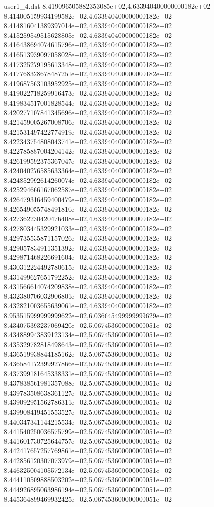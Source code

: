 \begin{filecontents}{user1_4.dat}
8.419096505882353085e+02,4.633940400000000182e+02
8.414005159934199582e+02,4.633940400000000182e+02
8.414816041389397014e+02,4.633940400000000182e+02
8.415259549515628805e+02,4.633940400000000182e+02
8.416438694074615796e+02,4.633940400000000182e+02
8.416513939097058028e+02,4.633940400000000182e+02
8.417325279195613348e+02,4.633940400000000182e+02
8.417768328678487251e+02,4.633940400000000182e+02
8.419687563103952925e+02,4.633940400000000182e+02
8.419022718259916473e+02,4.633940400000000182e+02
8.419834517001828544e+02,4.633940400000000182e+02
8.420277107841345696e+02,4.633940400000000182e+02
8.421459005267008706e+02,4.633940400000000182e+02
8.421531497422774919e+02,4.633940400000000182e+02
8.422343754808043741e+02,4.633940400000000182e+02
8.422785887004204142e+02,4.633940400000000182e+02
8.426199592375367047e+02,4.633940400000000182e+02
8.424040276585633364e+02,4.633940400000000182e+02
8.424852992614260074e+02,4.633940400000000182e+02
8.425294666167062587e+02,4.633940400000000182e+02
8.426479316459400479e+02,4.633940400000000182e+02
8.426549055748491810e+02,4.633940400000000182e+02
8.427362230420476408e+02,4.633940400000000182e+02
8.427803445329921033e+02,4.633940400000000182e+02
8.429735535871157026e+02,4.633940400000000182e+02
8.429057834911351392e+02,4.633940400000000182e+02
8.429871468226691604e+02,4.633940400000000182e+02
8.430312224492780615e+02,4.633940400000000182e+02
8.431499627651792252e+02,4.633940400000000182e+02
8.431566614074209838e+02,4.633940400000000182e+02
8.432380706032906801e+02,4.633940400000000182e+02
8.432821003655639061e+02,4.633940400000000182e+02
8.953515999999999622e+02,6.036645499999999629e+02
8.434075393237069420e+02,5.067453600000000051e+02
8.434889943839123134e+02,5.067453600000000051e+02
8.435329782818498643e+02,5.067453600000000051e+02
8.436519938844185162e+02,5.067453600000000051e+02
8.436584172399927866e+02,5.067453600000000051e+02
8.437399181645338331e+02,5.067453600000000051e+02
8.437838561981357088e+02,5.067453600000000051e+02
8.439783508638361127e+02,5.067453600000000051e+02
8.439092951562786311e+02,5.067453600000000051e+02
8.439908419451553527e+02,5.067453600000000051e+02
8.440347341144215534e+02,5.067453600000000051e+02
8.441540250036575799e+02,5.067453600000000051e+02
8.441601730725644757e+02,5.067453600000000051e+02
8.442417657257769861e+02,5.067453600000000051e+02
8.442856120307073979e+02,5.067453600000000051e+02
8.446325004105572134e+02,5.067453600000000051e+02
8.444110509888503202e+02,5.067453600000000051e+02
8.444926895063986194e+02,5.067453600000000051e+02
8.445364899469932425e+02,5.067453600000000051e+02

\end{filecontents}
